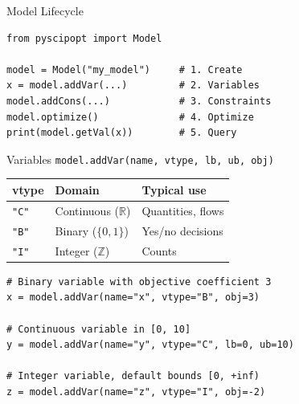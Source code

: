 \documentclass[aspectratio=169,10pt]{beamer}
\begin{document}
\begin{frame}[fragile]{Model Lifecycle}
\begin{center}
\end{center}

\medskip
\begin{lstlisting}
from pyscipopt import Model

model = Model("my_model")     # 1. Create
x = model.addVar(...)         # 2. Variables
model.addCons(...)            # 3. Constraints
model.optimize()              # 4. Optimize
print(model.getVal(x))        # 5. Query
\end{lstlisting}
\end{frame}

\begin{frame}[fragile]{Variables}
\texttt{model.addVar(name, vtype, lb, ub, obj)}
\medskip
\begin{table}
\centering
\begin{tabular}{lll}
\toprule
\textbf{vtype} & \textbf{Domain} & \textbf{Typical use} \\
\midrule
\texttt{"C"} & Continuous ($\mathbb{R}$) & Quantities, flows \\
\texttt{"B"} & Binary ($\{0,1\}$) & Yes/no decisions \\
\texttt{"I"} & Integer ($\mathbb{Z}$) & Counts \\
\bottomrule
\end{tabular}
\end{table}

\medskip
\begin{lstlisting}
# Binary variable with objective coefficient 3
x = model.addVar(name="x", vtype="B", obj=3)

# Continuous variable in [0, 10]
y = model.addVar(name="y", vtype="C", lb=0, ub=10)

# Integer variable, default bounds [0, +inf)
z = model.addVar(name="z", vtype="I", obj=-2)
\end{lstlisting}
\end{frame}
\end{document}
